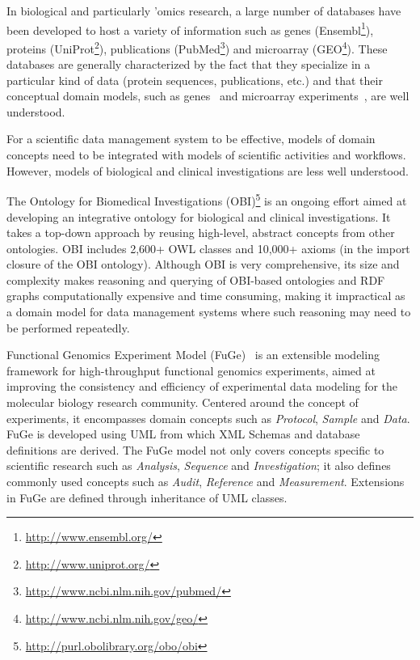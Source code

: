 \documentclass[conference,10pt]{IEEEtran}
\begin{document}
In biological and particularly 'omics research, a large number of databases have been developed to host a variety of information such as genes (Ensembl\footnote{\url{http://www.ensembl.org/}}), proteins (UniProt\footnote{\url{http://www.uniprot.org/}}), publications (PubMed\footnote{\url{http://www.ncbi.nlm.nih.gov/pubmed/}}) and microarray (GEO\footnote{\url{http://www.ncbi.nlm.nih.gov/geo/}}). These databases are generally characterized by the fact that they specialize in a particular kind of data (protein sequences, publications, etc.) and that their conceptual domain models, such as genes~\cite{citeulike:212874} and microarray experiments~\cite{citeulike:151946}, are well understood.

For a scientific data management system to be effective, models of domain concepts need to be integrated with models of scientific activities and workflows. However, models of biological and clinical investigations are less well understood.

The Ontology for Biomedical Investigations (OBI)\footnote{\url{http://purl.obolibrary.org/obo/obi}} is an ongoing effort aimed at developing an integrative ontology for biological and clinical investigations. It takes a top-down approach by reusing high-level, abstract concepts from other ontologies. OBI includes 2,600+ OWL classes and 10,000+ axioms (in the import closure of the OBI ontology). Although OBI is very comprehensive, its size and complexity makes reasoning and querying of OBI-based ontologies and RDF graphs computationally expensive and time consuming, making it impractical as a domain model for data management systems where such reasoning may need to be performed repeatedly.

Functional Genomics Experiment Model (FuGe)~\cite{citeulike:1756058} is an extensible modeling framework for high-throughput functional genomics experiments, aimed at improving the consistency and efficiency of experimental data modeling for the molecular biology research community. Centered around the concept of experiments, it encompasses domain concepts such as \emph{Protocol}, \emph{Sample} and \emph{Data}. FuGe is developed using UML from which XML Schemas and database definitions are derived. The FuGe model not only covers concepts specific to scientific research such as \emph{Analysis}, \emph{Sequence} and \emph{Investigation}; it also defines commonly used concepts such as \emph{Audit}, \emph{Reference} and \emph{Measurement}. Extensions in FuGe are defined through inheritance of UML classes.
\end{document}
